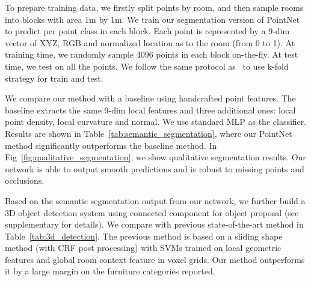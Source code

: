To prepare training data, we firstly split points by room, and then sample rooms into blocks with area 1m by 1m. We train our segmentation version of PointNet to predict per point class in each block. Each point is represented by a 9-dim vector of XYZ, RGB and normalized location as to the room (from 0 to 1). At training time, we randomly sample 4096 points in each block on-the-fly. At test time, we test on all the points. We follow the same protocol as~\cite{armeni_cvpr16} to use k-fold strategy for train and test.


We compare our method with a baseline using handcrafted point features. The baseline extracts the same 9-dim local features and three additional ones: local point density, local curvature and normal. We use standard MLP as the classifier.  Results are shown in Table~\ref{tab:semantic_segmentation}, where our PointNet method significantly outperforms the baseline method. In Fig~\ref{fig:qualitative_segmentation}, we show qualitative segmentation results. Our network is able to output smooth predictions and is robust to missing points and occlusions.




Based on the semantic segmentation output from our network, we further build a 3D object detection system using connected component for object proposal (see supplementary for details). We compare with previous state-of-the-art method in Table~\ref{tab:3d_detection}. The previous method is based on a sliding shape method (with CRF post processing) with SVMs trained on local geometric features and global room context feature in voxel grids. Our method outperforms it by a large margin on the furniture categories reported.




